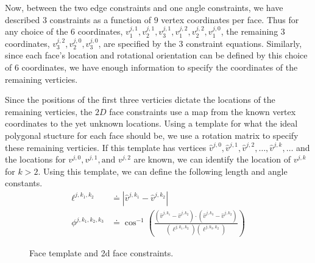 Now, between the two edge constraints and one angle constraints, we have described $3$ constraints as a function of $9$ vertex coordinates per face. Thus for any choice of the $6$ coordinates, $v^{j,1}_1, v^{j,1}_2, v^{j,1}_3, v^{j,2}_1, v^{j,2}_2, v^{j,0}_1$, the remaining $3$ coordinates, $v^{j,2}_3, v^{j,0}_2, v^{j,0}_3$, are specified by the $3$ constraint equations. Similarly, since each face's location and rotational orientation can be defined by this choice of $6$ coordinates, we have enough information to specify the coordinates of the remaining verticies. 

Since the positions of the first three verticies dictate the locations of the remaining verticies, the $2D$ face constraints use a map from the known vertex coordinates to the yet unknown locations. Using a template for what the ideal polygonal stucture for each face should be, we use a rotation matrix to specify these remaining verticies. If this template has vertices $\hat{v}^{j,0}, \hat{v}^{j,1}, \hat{v}^{j,2}, \dots, \hat{v}^{j,k}, \dots$ and the locations for $v^{j,0}, v^{j,1}, \text{and } v^{j,2}$ are known, we can identify the location of $v^{j,k}$ for $k>2$. Using this template, we can define the following length and angle constants.
\begin{align}
\ell^{j,k_1, k_2} &\doteq |\hat{v}^{j,k_1} - \hat{v}^{j,k_2}| \\ 
\phi^{j,k_1,k_2,k_3} &\doteq \cos^{-1}\left(\frac{\left(\hat{v}^{j,k_1} - \hat{v}^{j,k_2}\right)\cdot\left(\hat{v}^{j,k_3} - \hat{v}^{j,k_2}\right)}{(\ell^{j,k_1, k_2})(\ell^{j,k_3, k_2})}\right)   
\end{align}

\begin{figure}[ht]
\caption{Face template and 2d face constraints.}
\label{fig:2DFC}
\end{figure}

